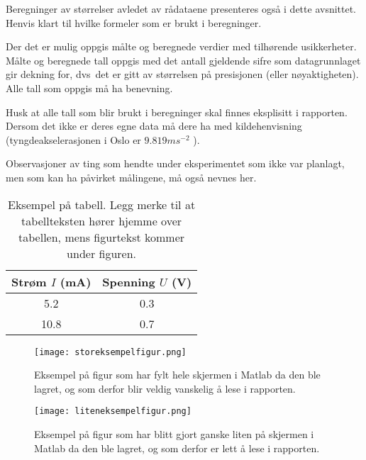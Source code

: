 \documentclass[norsk,a4paper,12pt]{article}
\begin{document}
Beregninger av størrelser avledet av rådataene presenteres også i dette avsnittet. Henvis klart til hvilke formeler som er brukt i beregninger.

Der det er mulig oppgis målte og beregnede verdier med tilhørende usikkerheter. Målte og beregnede tall oppgis med det antall gjeldende sifre som datagrunnlaget gir dekning for, dvs\ det er gitt av størrelsen på presisjonen (eller nøyaktigheten). Alle tall som oppgis må ha benevning.

Husk at alle tall som blir brukt i beregninger skal finnes eksplisitt i rapporten. Dersom det ikke er deres egne data må dere ha med kildehenvisning (tyngdeakselerasjonen i Oslo er $9.819 ms^{-2}$ \cite{g_Wik}).

Observasjoner av ting som hendte under eksperimentet som ikke
  var planlagt, men som kan ha påvirket målingene, må også nevnes her.

\begin{table}
  \begin{center}
  \caption{Eksempel på tabell. Legg merke til at tabellteksten hører hjemme over tabellen, mens figurtekst kommer under figuren.}
  \begin{tabular}{|c|c|} \hline
  \textbf{Strøm $I$ (mA)} & \textbf{Spenning $U$ (V)} \\ \hline
  5.2 & 0.3 \\
  10.8 & 0.7 \\ \hline
  \end{tabular}
  \end{center}
  \label{tab:eksempel}
\end{table}

\begin{figure}
\begin{center}
  \texttt{[image: storeksempelfigur.png]}\\
  \caption{Eksempel på figur som har fylt hele skjermen i Matlab da den ble lagret, og som derfor blir veldig vanskelig å lese i rapporten. }\label{fig:Matlabstor}
  \end{center}
\end{figure}

\begin{figure}
\begin{center}
  \texttt{[image: liteneksempelfigur.png]}\\
  \caption{Eksempel på figur som har blitt gjort ganske liten på skjermen i Matlab da den ble lagret, og som derfor er lett å lese i rapporten. }\label{fig:Matlabliten}
  \end{center}
\end{figure}
\end{document}
